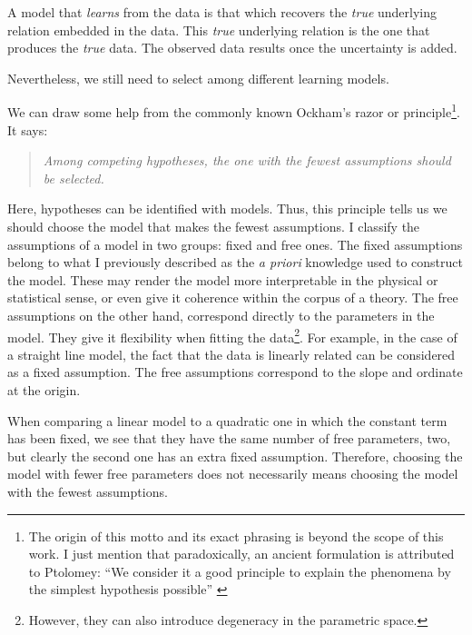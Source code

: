A model that \emph{learns} from the data is that which recovers the \emph{true} underlying relation embedded in the data. This \emph{true} underlying relation is the one that produces the \emph{true} data. The observed data results once the uncertainty is added. 

Nevertheless, we still need to select among different learning models.  

We can draw some help from the commonly known Ockham's razor or principle\footnote{The origin of this motto and its exact phrasing is beyond the scope of this work. I just mention that paradoxically, an ancient formulation is attributed to Ptolomey: ``We consider it a good principle to explain the phenomena by the simplest hypothesis possible'' \citep{Franklin2002}}. It says:
\begin{quotation}
\textit{Among competing hypotheses, the one with the fewest assumptions should be selected.}
\end{quotation}

Here, hypotheses can be identified with models. Thus, this principle tells us we should choose the model that makes the fewest assumptions. I classify the assumptions of a model in two groups: fixed and free ones. The fixed assumptions belong to what I previously described as the \emph{a priori} knowledge used to construct the model. These may render the model more interpretable in the physical or statistical sense, or even give it coherence within the corpus of a theory. The free assumptions on the other hand, correspond directly to the parameters in the model. They give it flexibility when fitting the data\footnote{However, they can also introduce degeneracy in the parametric space.}. For example, in the case of a straight line model, the fact that the data is linearly related can be considered as a fixed assumption. The free assumptions correspond to the slope and ordinate at the origin. 

When comparing a linear model to a quadratic one in which the constant term has been fixed, we see that they have the same number of free parameters, two, but clearly the second one has an extra fixed assumption. Therefore, choosing the model with fewer free parameters does not necessarily means choosing the model with the fewest assumptions.

